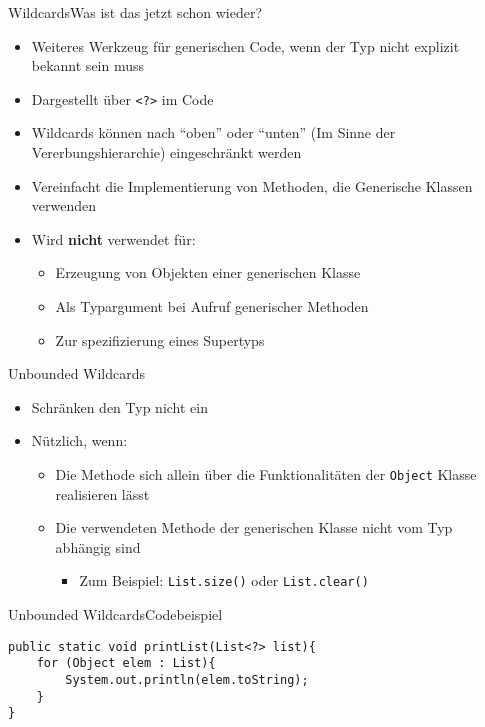 \begin{frame}{Wildcards}{Was ist das jetzt schon wieder?}
    \begin{itemize}
        \item Weiteres Werkzeug für generischen Code, wenn der Typ nicht explizit bekannt sein muss
        \item Dargestellt über \texttt{<?>} im Code
        \item Wildcards können nach "`oben"' oder "`unten"' (Im Sinne der Vererbungshierarchie) eingeschränkt werden
        \item Vereinfacht die Implementierung von Methoden, die Generische Klassen verwenden
        \item Wird \textbf{nicht} verwendet für:
        \begin{itemize}
            \item Erzeugung von Objekten einer generischen Klasse
            \item Als Typargument bei Aufruf generischer Methoden
            \item Zur spezifizierung eines Supertyps
        \end{itemize}
    \end{itemize}
\end{frame}

\begin{frame}{Unbounded Wildcards}
    \begin{itemize}
        \item Schränken den Typ nicht ein
        \item Nützlich, wenn:
        \begin{itemize}
            \item Die Methode sich allein über die Funktionalitäten der \texttt{Object} Klasse realisieren lässt
            \item Die verwendeten Methode der generischen Klasse nicht vom Typ abhängig sind
            \begin{itemize}
                \item Zum Beispiel: \texttt{List.size()} oder \texttt{List.clear()}
            \end{itemize}
        \end{itemize}
    \end{itemize}
\end{frame}

\begin{frame}[fragile]{Unbounded Wildcards}{Codebeispiel}
\lstset{style=java}
\begin{lstlisting}
public static void printList(List<?> list){
    for (Object elem : List){
        System.out.println(elem.toString);
    }
}
\end{lstlisting}
\end{frame}

